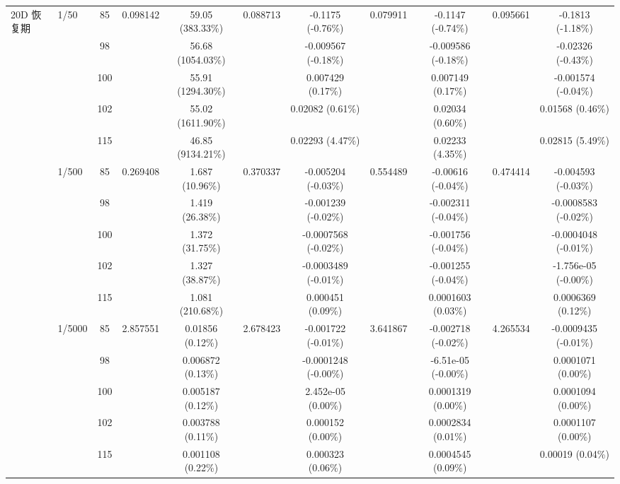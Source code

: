 \begin{table}[htbp]
{\begin{tabular}{llccccccccc}
\multirow{15}{*}{20D 恢复期}
& \multirow{5}{*}{1/50} & 85 & \multirow{5}{*}{0.098142} & 59.05 (383.33\%) & \multirow{5}{*}{0.088713} & -0.1175 (-0.76\%) & \multirow{5}{*}{0.079911} & -0.1147 (-0.74\%) & \multirow{5}{*}{0.095661} & -0.1813 (-1.18\%) \\
& & 98 & & 56.68 (1054.03\%) & & -0.009567 (-0.18\%) & & -0.009586 (-0.18\%) & & -0.02326 (-0.43\%) \\
& & 100 & & 55.91 (1294.30\%) & & 0.007429 (0.17\%) & & 0.007149 (0.17\%) & & -0.001574 (-0.04\%) \\
& & 102 & & 55.02 (1611.90\%) & & 0.02082 (0.61\%) & & 0.02034 (0.60\%) & & 0.01568 (0.46\%) \\
& & 115 & & 46.85 (9134.21\%) & & 0.02293 (4.47\%) & & 0.02233 (4.35\%) & & 0.02815 (5.49\%) \\
\cmidrule(lr){2-11}
& \multirow{5}{*}{1/500} & 85 & \multirow{5}{*}{0.269408} & 1.687 (10.96\%) & \multirow{5}{*}{0.370337} & -0.005204 (-0.03\%) & \multirow{5}{*}{0.554489} & -0.00616 (-0.04\%) & \multirow{5}{*}{0.474414} & -0.004593 (-0.03\%) \\
& & 98 & & 1.419 (26.38\%) & & -0.001239 (-0.02\%) & & -0.002311 (-0.04\%) & & -0.0008583 (-0.02\%) \\
& & 100 & & 1.372 (31.75\%) & & -0.0007568 (-0.02\%) & & -0.001756 (-0.04\%) & & -0.0004048 (-0.01\%) \\
& & 102 & & 1.327 (38.87\%) & & -0.0003489 (-0.01\%) & & -0.001255 (-0.04\%) & & -1.756e-05 (-0.00\%) \\
& & 115 & & 1.081 (210.68\%) & & 0.000451 (0.09\%) & & 0.0001603 (0.03\%) & & 0.0006369 (0.12\%) \\
\cmidrule(lr){2-11}
& \multirow{5}{*}{1/5000} & 85 & \multirow{5}{*}{2.857551} & 0.01856 (0.12\%) & \multirow{5}{*}{2.678423} & -0.001722 (-0.01\%) & \multirow{5}{*}{3.641867} & -0.002718 (-0.02\%) & \multirow{5}{*}{4.265534} & -0.0009435 (-0.01\%) \\
& & 98 & & 0.006872 (0.13\%) & & -0.0001248 (-0.00\%) & & -6.51e-05 (-0.00\%) & & 0.0001071 (0.00\%) \\
& & 100 & & 0.005187 (0.12\%) & & 2.452e-05 (0.00\%) & & 0.0001319 (0.00\%) & & 0.0001094 (0.00\%) \\
& & 102 & & 0.003788 (0.11\%) & & 0.000152 (0.00\%) & & 0.0002834 (0.01\%) & & 0.0001107 (0.00\%) \\
& & 115 & & 0.001108 (0.22\%) & & 0.000323 (0.06\%) & & 0.0004545 (0.09\%) & & 0.00019 (0.04\%) \\
\bottomrule
  \end{tabular}%
  }
\end{table}
